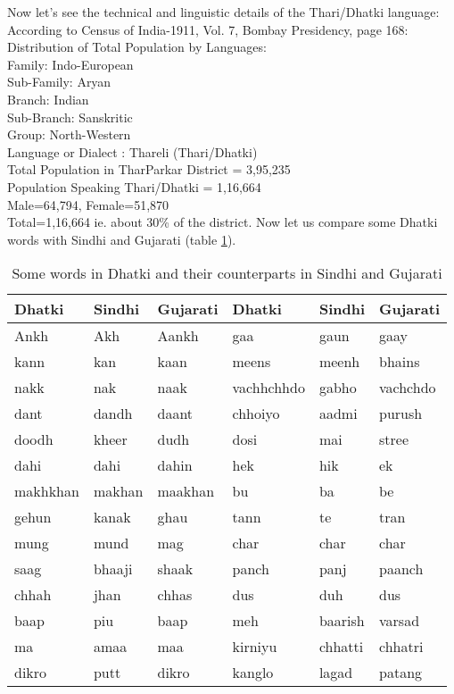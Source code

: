 Now let's see the technical and linguistic details of the Thari/Dhatki language:
According to Census of India-1911, Vol. 7, Bombay Presidency, page 168: Distribution of Total Population by Languages:\\
Family\hfill : Indo-European\\
Sub-Family\hfill : Aryan\\
Branch\hfill : Indian\\
Sub-Branch\hfill : Sanskritic\\
Group\hfill : North-Western\\
Language or Dialect \hfill : Thareli (Thari/Dhatki)\\
Total Population in TharParkar District = 3,95,235\\
Population Speaking Thari/Dhatki = 1,16,664\\
Male=64,794, Female=51,870\\
Total=1,16,664 ie. about 30\% of the district.
Now let us compare some Dhatki words with Sindhi and Gujarati (table \ref{tbl:words}).
\begin{table}
\begin{center}
\begin{tabular}{l|l|l|l|l|l}
\hline
\textbf{Dhatki} & \textbf{Sindhi} & \textbf{Gujarati} & \textbf{Dhatki} & \textbf{Sindhi} & \textbf{Gujarati} \\
\hline
Ankh & Akh & Aankh & gaa & gaun & gaay \\
kann & kan & kaan & meens & meenh & bhains \\
nakk & nak & naak & vachhchhdo & gabho & vachchdo \\ 
dant & dandh & daant & chhoiyo & aadmi & purush \\ 
doodh & kheer & dudh & dosi & mai & stree \\ 
dahi & dahi & dahin & hek & hik & ek \\ 
makhkhan & makhan &  maakhan & bu & ba & be \\ 
gehun & kanak & ghau & tann & te & tran \\ 
mung & mund & mag & char & char & char \\ 
saag & bhaaji & shaak & panch & panj & paanch \\ 
chhah & jhan & chhas & dus & duh & dus \\ 
baap & piu & baap & meh & baarish & varsad \\ 
ma & amaa & maa & kirniyu & chhatti & chhatri \\ 
dikro & putt & dikro & kanglo & lagad & patang\\
\hline
\end{tabular}
\end{center}
\label{tbl:words}
\caption{Some words in Dhatki and their counterparts in Sindhi and Gujarati}
\end{table}

